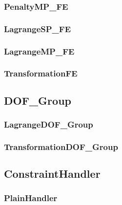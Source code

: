 \documentclass[12pt]{article}
\begin{document}
\pagebreak \subsubsection{PenaltyMP\_FE}



\pagebreak \subsubsection{LagrangeSP\_FE}


\pagebreak \subsubsection{LagrangeMP\_FE}


\pagebreak \subsubsection{TransformationFE}


\pagebreak \subsection{DOF\_Group}


\pagebreak \subsubsection{LagrangeDOF\_Group}


\pagebreak \subsubsection{TransformationDOF\_Group}



\pagebreak \subsection{{\bf ConstraintHandler}}


\pagebreak \subsubsection{PlainHandler}

\end{document}

